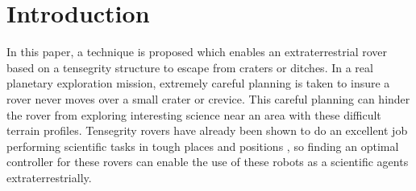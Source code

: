 \documentclass{llncs}
\begin{document}
\section{Introduction}
\label{introduction}

In this paper, a technique is proposed which enables an extraterrestrial rover based on a tensegrity structure to escape from craters or ditches.
In a real planetary exploration mission, extremely careful planning is taken to insure a rover never moves over a small crater or crevice.
This careful planning can hinder the rover from exploring interesting science near an area with these difficult terrain profiles.
Tensegrity rovers have already been shown to do an excellent job performing scientific tasks in tough places and positions \cite{iscen2013robust}, so finding an optimal controller for these rovers can enable the use of these robots as a scientific agents extraterrestrially.
\end{document}
